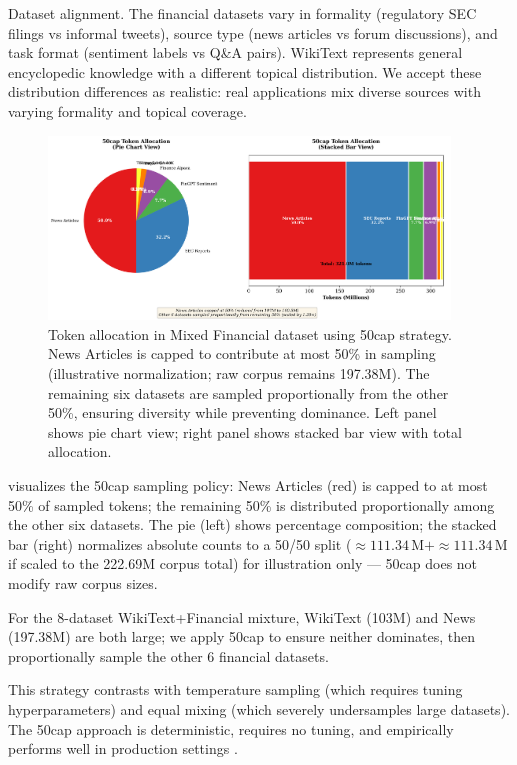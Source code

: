 Dataset alignment. The financial datasets vary in formality (regulatory SEC filings vs informal tweets), source type (news articles vs forum discussions), and task format (sentiment labels vs Q\&A pairs). WikiText represents general encyclopedic knowledge with a different topical distribution. We accept these distribution differences as realistic: real applications mix diverse sources with varying formality and topical coverage.

\begin{figure}[h]
\centering
\includegraphics[width=0.95\textwidth]{figures/diagram_50cap.png}
\caption[50cap Mixture Strategy Visualization]{Token allocation in Mixed Financial dataset using 50cap strategy. News Articles is capped to contribute at most 50\% in sampling (illustrative normalization; raw corpus remains 197.38M). The remaining six datasets are sampled proportionally from the other 50\%, ensuring diversity while preventing dominance. Left panel shows pie chart view; right panel shows stacked bar view with total allocation.}
\label{fig:diagram_50cap}
\end{figure}

 visualizes the 50cap sampling policy: News Articles (red) is capped to at most 50\% of sampled tokens; the remaining 50\% is distributed proportionally among the other six datasets. The pie (left) shows percentage composition; the stacked bar (right) normalizes absolute counts to a 50/50 split (\(\approx\!111.34\,\text{M}+\approx\!111.34\,\text{M}\) if scaled to the 222.69M corpus total) for illustration only — 50cap does not modify raw corpus sizes.

For the 8-dataset WikiText+Financial mixture, WikiText (103M) and News (197.38M) are both large; we apply 50cap to ensure neither dominates, then proportionally sample the other 6 financial datasets.

This strategy contrasts with temperature sampling (which requires tuning hyperparameters) and equal mixing (which severely undersamples large datasets). The 50cap approach is deterministic, requires no tuning, and empirically performs well in production settings \parencite{longpre2023pretrainer}.

